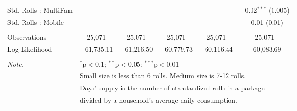 \begin{table}[!htbp]
\begin{tabular}{@{\extracolsep{5pt}}lccccc}
  Std. Rolls : MultiFam &  &  &  &  & $-$0.02$^{***}$ (0.005) \\ 
  Std. Rolls : Mobile &  &  &  &  & $-$0.01 (0.01) \\ 
 \hline \\[-1.8ex] 
Observations & 25,071 & 25,071 & 25,071 & 25,071 & 25,071 \\ 
Log Likelihood & $-$61,735.11 & $-$61,216.50 & $-$60,779.73 & $-$60,116.44 & $-$60,083.69 \\ 
\hline 
\hline \\[-1.8ex] 
\textit{Note:}  & \multicolumn{5}{l}{$^{*}$p$<$0.1; $^{**}$p$<$0.05; $^{***}$p$<$0.01} \\ 
 & \multicolumn{5}{l}{Small size is less than 6 rolls. Medium size is 7-12 rolls. } \\ 
 & \multicolumn{5}{l}{Days' supply is the number of standardized rolls in a package} \\ 
 & \multicolumn{5}{l}{divided by a household's average daily consumption.} \\ 
\end{tabular} 
\end{table} 

